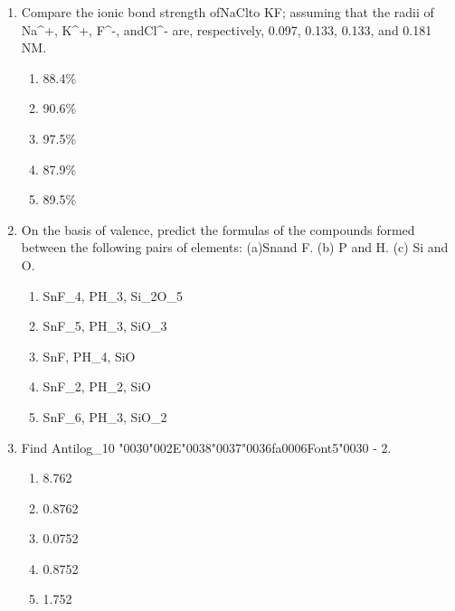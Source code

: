 \documentclass[12pt]{article}
\begin{document}
\begin{enumerate}[label=\arabic*.]
\begin{enumerate}[label=(\alph*)]
    \item T-shaped
    \item Trigonal planar
    \item Trigonal bipyramidal
\end{enumerate}
\item Compare the ionic bond strength ofNaClto KF; assuming that the radii of Na\^{}+, K\^{}+, F\^{}-,
andCl\^{}- are, respectively, 0.097, 0.133, 0.133, and 0.181 NM.
\begin{enumerate}[label=(\alph*)]
    \item 88.4\%
    \item 90.6\%
    \item 97.5\%
    \item 87.9\%
    \item 89.5\%
\end{enumerate}
\item On the basis of valence, predict the formulas of the compounds formed between the
following pairs of elements: (a)Snand F. (b) P and H. (c) Si and O.
\begin{enumerate}[label=(\alph*)]
    \item SnF\_4, PH\_3, Si\_2O\_5
    \item SnF\_5, PH\_3, SiO\_3
    \item SnF, PH\_4, SiO
    \item SnF\_2, PH\_2, SiO
    \item SnF\_6, PH\_3, SiO\_2
\end{enumerate}
\item Find Antilog\_10 {\char"0030}{\char"002E}{\char"0038}{\char"0037}{\char"0036}{\csname fa0006Font5\endcsname\char"0030} - 2.
\begin{enumerate}[label=(\alph*)]
    \item 8.762
    \item 0.8762
    \item 0.0752
    \item 0.8752
    \item 1.752
\end{enumerate}
\end{enumerate}
\end{document}
